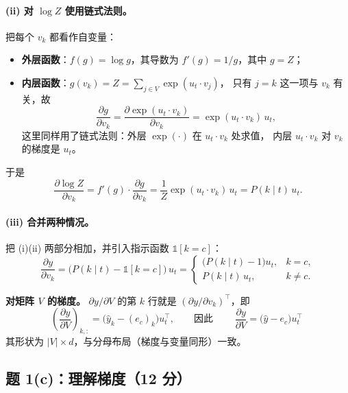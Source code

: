 \documentclass[11pt,a4paper]{article}
\begin{document}
\paragraph{(ii) 对 $\log Z$ 使用链式法则。}
把每个 $v_k$ 都看作自变量：
\begin{itemize}
  \item \textbf{外层函数}：$f(g)=\log g$，其导数为 $f'(g)=1/g$，其中 $g=Z$；
  \item \textbf{内层函数}：$g(v_k)=Z=\sum_{j\in V}\exp(u_t\cdot v_j)$，
  只有 $j=k$ 这一项与 $v_k$ 有关，故
  \begin{equation}
  \frac{\partial g}{\partial v_k}
  =\frac{\partial\exp(u_t\cdot v_k)}{\partial v_k}
  =\exp(u_t\cdot v_k)\,u_t ,
  \end{equation}
  这里同样用了链式法则：外层 $\exp(\cdot)$ 在 $u_t\cdot v_k$ 处求值，
  内层 $u_t\cdot v_k$ 对 $v_k$ 的梯度是 $u_t$。
\end{itemize}
于是
\begin{equation}
\frac{\partial\log Z}{\partial v_k}
=f'(g)\cdot\frac{\partial g}{\partial v_k}
=\frac{1}{Z}\exp(u_t\cdot v_k)\,u_t
=P(k\mid t)\,u_t .
\end{equation}

\paragraph{(iii) 合并两种情况。}
把 (i)(ii) 两部分相加，并引入指示函数 $\mathbb{1}[k=c]$：
\begin{equation}
\boxed{\;
\frac{\partial y}{\partial v_k}
=\bigl(P(k\mid t)-\mathbb{1}[k=c]\bigr)\,u_t
=\begin{cases}
\bigl(P(k\mid t)-1\bigr)u_t, & k=c,\\[2pt]
P(k\mid t)\,u_t, & k\neq c .
\end{cases}\;}
\label{eq:grad-v}
\end{equation}

\textbf{对矩阵 $V$ 的梯度。} $\partial y/\partial V$ 的第 $k$ 行就是
$(\partial y/\partial v_k)^\top$，即
\begin{equation}
\left(\frac{\partial y}{\partial V}\right)_{k,:}
=\bigl(\hat y_k-(e_c)_k\bigr)u_t^\top,
\qquad\text{因此}\qquad
\boxed{\;\frac{\partial y}{\partial V}
=\bigl(\hat y-e_c\bigr)u_t^\top\;}
\label{eq:grad-V}
\end{equation}
其形状为 $|V|\times d$，与分母布局（梯度与变量同形）一致。

\subsection{题 1(c)：理解梯度（12 分）}
\end{document}
